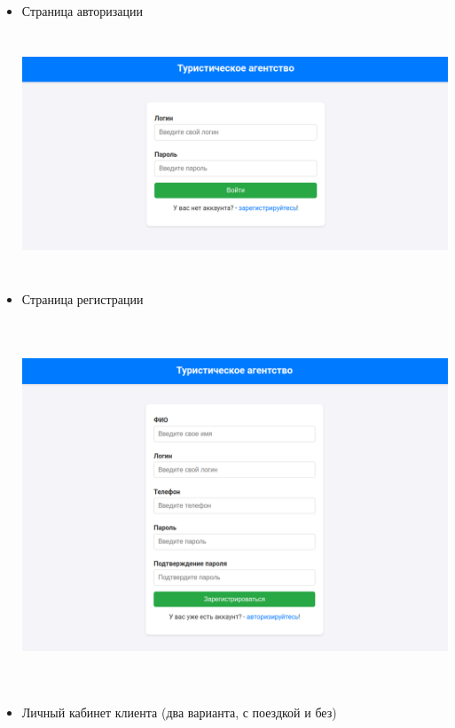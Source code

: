 \documentclass[a4paper,12pt]{article}
\begin{document}
\begin{itemize}
    \item Страница авторизации

          \includegraphics[width=6.260415573053368in, height=2.84375in]{media/unregistered/login.png}

    \item Страница регистрации

          \includegraphics[width=6.260415573053368in, height=4.3125in]{media/unregistered/reg.png}

    \item Личный кабинет клиента (два варианта, с поездкой и без)


\end{itemize}
\end{document}
